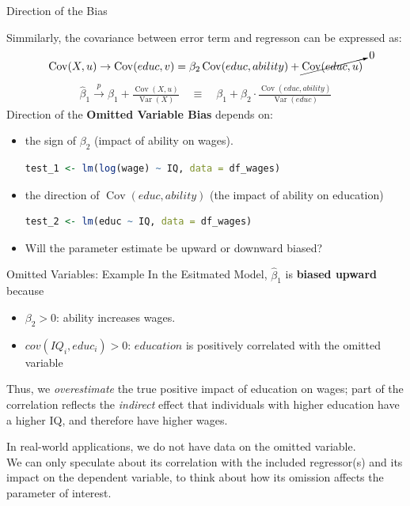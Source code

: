 \documentclass[11pt, aspectratio = 169]{beamer}
\begin{document}
\begin{frame}[fragile]{Direction of the Bias}

Simmilarly, the covariance between error term and regresson can be expressed as:
\begin{align*}
    \operatorname{Cov}(X,u) \rightarrow \operatorname{Cov}(educ,v) = \beta_2 \operatorname{Cov}(educ,ability) + \cancelto{0}{\operatorname{Cov}(educ,u)}
\end{align*}
\begin{align*}
    \hat{\beta}_1 \xrightarrow{p} \beta_1 +
    \frac{\operatorname{Cov}(X,u)}{\operatorname{Var}(X)} \quad \equiv \quad \beta_1 + \beta_2 \cdot \frac{\operatorname{Cov}(educ,ability)}{\operatorname{Var}(educ)}
\end{align*}
\pause
\vspace{2mm}
Direction of the \textbf{Omitted Variable Bias} depends on:
\vspace{-3mm}
\begin{itemize}
    \item the sign of $\beta_2$ (impact of ability on wages).
    \begin{lstlisting}[language=R]
    test_1 <- lm(log(wage) ~ IQ, data = df_wages)
    \end{lstlisting}
    \item the direction of $\operatorname{Cov}(educ, ability)$ (the impact of ability on education)
    \begin{lstlisting}[language=R]
    test_2 <- lm(educ ~ IQ, data = df_wages)
    \end{lstlisting}
    \pause
    \vspace{1mm}
    \item[$\rightarrow$] Will the parameter estimate be upward or downward biased?
\end{itemize}

\end{frame}

\begin{frame}[fragile]{Omitted Variables: Example}
In the Esitmated Model, $\hat{\beta}_1$ is \textbf{\color{teal}biased upward} because 
\begin{itemize}
    \item $\beta_2 > 0$: ability increases wages.
    \item $cov(IQ_i, educ_i) > 0$: $education$ is positively correlated with the omitted variable
    \footnotesize

\end{itemize}
Thus, we \textit{overestimate} the true positive impact of education on wages; part of the correlation reflects the \textit{indirect} effect that individuals with higher education have a higher IQ, and therefore have higher wages.

\bigskip

In real-world applications, we do not have data on the omitted variable. \\
We can only speculate about its correlation with the included regressor(s) and its impact on the dependent variable, to think about how its omission affects the parameter of interest.
\end{frame}
\end{document}
